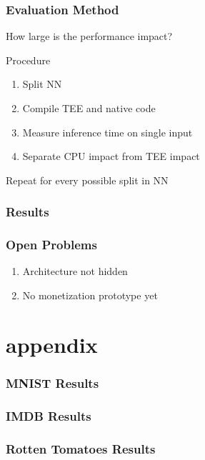 \documentclass[aspectratio=169,nototalframenumber]{beamer}
\begin{document}
\begin{frame}
    \frametitle{Evaluation Method}
	How large is the performance impact?\par
	\begin{block}{Procedure}
	\begin{enumerate}
		\item Split NN
		\item Compile TEE and native code
		\item Measure inference time on single input
		\item Separate CPU impact from TEE impact
	\end{enumerate}
	\end{block}

	\vspace{1cm}
	Repeat for every possible split in NN
\end{frame}

\begin{frame}
    \frametitle{Results}

\end{frame}

\begin{frame}
    \frametitle{Open Problems}

	\begin{enumerate}
		\item Architecture not hidden
		\item No monetization prototype yet
	\end{enumerate}
\end{frame}

\section{appendix}
\begin{frame}
    \frametitle{MNIST Results}
\end{frame}
\begin{frame}
    \frametitle{IMDB Results}
\end{frame}
\begin{frame}
    \frametitle{Rotten Tomatoes Results}
\end{frame}
\end{document}
